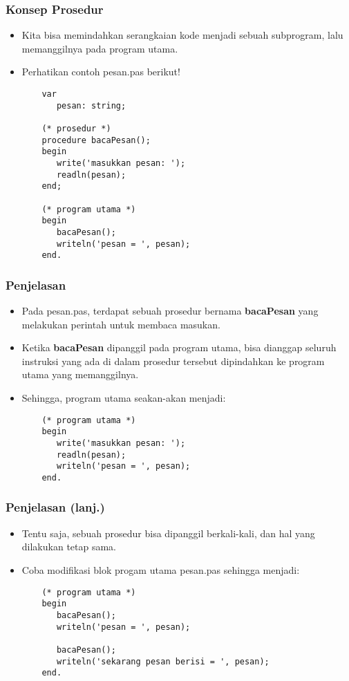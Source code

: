 \documentclass{beamer}
\begin{document}
\begin{frame}[fragile]
\frametitle{Konsep Prosedur}
\begin{itemize}
    \item Kita bisa memindahkan serangkaian kode menjadi sebuah subprogram, lalu memanggilnya pada program utama.
    \item Perhatikan contoh pesan.pas berikut!
    \begin{lstlisting}
    var
       pesan: string;

    (* prosedur *)
    procedure bacaPesan();
    begin
       write('masukkan pesan: ');
       readln(pesan);
    end;

    (* program utama *)
    begin
       bacaPesan();
       writeln('pesan = ', pesan);
    end.
    \end{lstlisting}
\end{itemize}
\end{frame}

\begin{frame}[fragile]
\frametitle{Penjelasan}
\begin{itemize}
    \item Pada pesan.pas, terdapat sebuah prosedur bernama \textbf{bacaPesan} yang melakukan perintah untuk membaca masukan.
    \item Ketika \textbf{bacaPesan} dipanggil pada program utama, bisa dianggap seluruh instruksi yang ada di dalam prosedur tersebut dipindahkan ke program utama yang memanggilnya.
    \item Sehingga, program utama seakan-akan menjadi:
    \begin{lstlisting}
    (* program utama *)
    begin
       write('masukkan pesan: ');
       readln(pesan);
       writeln('pesan = ', pesan);
    end.
    \end{lstlisting}
\end{itemize}
\end{frame}

\begin{frame}[fragile]
\frametitle{Penjelasan (lanj.)}
\begin{itemize}
    \item Tentu saja, sebuah prosedur bisa dipanggil berkali-kali, dan hal yang dilakukan tetap sama.
    \item Coba modifikasi blok progam utama pesan.pas sehingga menjadi:
    \begin{lstlisting}
    (* program utama *)
    begin
       bacaPesan();
       writeln('pesan = ', pesan);

       bacaPesan();
       writeln('sekarang pesan berisi = ', pesan);
    end.
    \end{lstlisting}
\end{itemize}
\end{frame}
\end{document}
